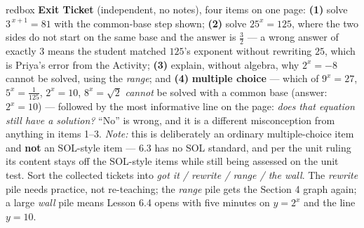 \documentclass[10pt]{article}
\begin{document}
\begin{skillbox}{redbox}
\textbf{Exit Ticket} (independent, no notes), four items on one page: \textbf{(1)} solve
$3^{\,x+1}=81$ with the common-base step shown; \textbf{(2)} solve $25^{x}=125$, where the two sides
do not start on the same base and the answer is $\frac32$ --- a wrong answer of exactly $3$ means the
student matched $125$'s exponent without rewriting $25$, which is Priya's error from the Activity;
\textbf{(3)} explain, without algebra, why $2^{x}=-8$ cannot be solved, using the \emph{range}; and
\textbf{(4)} \textbf{multiple choice} --- which of $9^{x}=27$, $5^{x}=\frac1{125}$, $2^{x}=10$,
$8^{x}=\sqrt2$ \emph{cannot} be solved with a common base (answer: $2^{x}=10$) --- followed by the most
informative line on the page: \emph{does that equation still have a solution?} ``No'' is wrong, and it
is a different misconception from anything in items 1--3. \emph{Note:} this is deliberately an ordinary
multiple-choice item and \textbf{not} an SOL-style item --- 6.3 has no SOL standard, and per the unit
ruling its content stays off the SOL-style items while still being assessed on the unit test. Sort the
collected tickets into \emph{got it / rewrite / range / the wall}. The \emph{rewrite} pile needs
practice, not re-teaching; the \emph{range} pile gets the Section 4 graph again; a large \emph{wall}
pile means Lesson 6.4 opens with five minutes on $y=2^{x}$ and the line $y=10$.
\end{skillbox}
\end{document}
